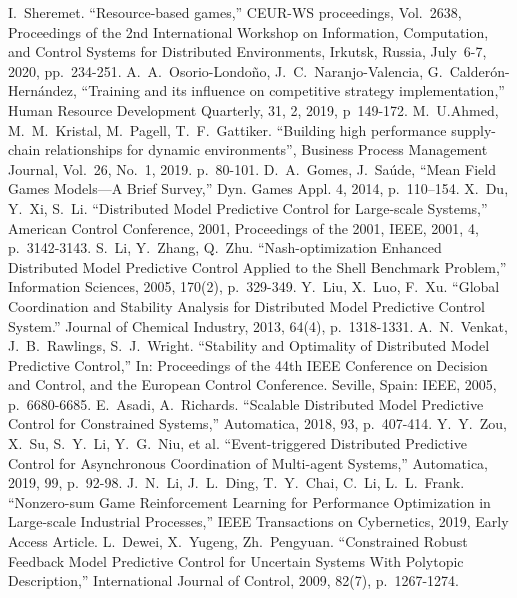 \documentclass[conference,a4paper]{IEEEtran}
\begin{document}
\begin{thebibliography}{999}

     I.~Sheremet. ``Resource-based games,'' CEUR-WS proceedings, Vol.~2638, Proceedings of the 2nd International Workshop on Information, Computation, and Control Systems for Distributed Environments, Irkutsk, Russia, July~6-7, 2020, pp.~234-251.
     A.~A.~Osorio-Londoño, J.~C.~Naranjo-Valencia, G.~Calderón-Hernández, ``Training and its influence on competitive strategy implementation,'' Human Resource Development Quarterly, 31, 2, 2019, p~149-172. 
    M.~U.Ahmed, M.~M.~Kristal, M.~Pagell, T.~F.~Gattiker. ``Building high performance supply-chain relationships for dynamic environments'', Business Process Management Journal, Vol.~26, No.~1, 2019. p.~80-101. 
      D.~A.~Gomes, J.~Saúde, ``Mean Field Games Models—A Brief Survey,'' Dyn. Games Appl. 4, 2014, p.~110–154. 
     X.~Du, Y.~Xi, S.~Li. ``Distributed Model Predictive Control for Large-scale Systems,'' American Control Conference, 2001, Proceedings of the 2001, IEEE, 2001, 4, p.~3142-3143.
     S.~Li, Y.~Zhang, Q.~Zhu. ``Nash-optimization Enhanced Distributed Model Predictive Control Applied to the Shell Benchmark Problem,'' Information Sciences, 2005, 170(2), p.~329-349.
     Y.~Liu, X.~Luo, F.~Xu. ``Global Coordination and Stability Analysis for Distributed Model Predictive Control System.'' Journal of Chemical Industry, 2013, 64(4), p.~1318-1331.
     A.~N.~Venkat, J.~B.~Rawlings, S.~J.~Wright. ``Stability and Optimality of Distributed Model Predictive Control,'' In: Proceedings of the 44th IEEE Conference on Decision and Control, and the European Control Conference. Seville, Spain: IEEE, 2005, p.~6680-6685.
     E.~Asadi, A.~Richards. ``Scalable Distributed Model Predictive Control for Constrained Systems,'' Automatica, 2018, 93, p.~407-414.
     Y.~Y.~Zou, X.~Su, S.~Y.~Li, Y.~G.~Niu, et al. ``Event-triggered Distributed Predictive Control for Asynchronous Coordination of Multi-agent Systems,'' Automatica, 2019, 99, p.~92-98.
     J.~N.~Li, J.~L.~Ding, T.~Y.~Chai, C.~Li, L.~L.~Frank. ``Nonzero-sum Game Reinforcement Learning for Performance Optimization in Large-scale Industrial Processes,'' IEEE Transactions on Cybernetics, 2019, Early Access Article.
     L.~Dewei, X.~Yugeng, Zh.~Pengyuan. ``Constrained Robust Feedback Model Predictive Control for Uncertain Systems With Polytopic Description,'' International Journal of Control, 2009, 82(7), p.~1267-1274.

\end{thebibliography}
\end{document}
